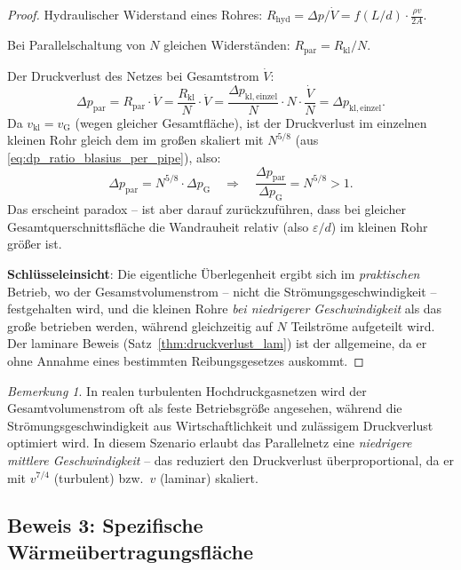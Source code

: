 ﻿\documentclass[12pt,a4paper,twoside]{article}
\theoremstyle{plain}
\theoremstyle{definition}
\theoremstyle{remark}
\newtheorem{remark}[theorem]{Bemerkung}
\begin{document}
\begin{proof}
\noindent
Hydraulischer Widerstand eines Rohres:
$R_{\mathrm{hyd}} = \Delta p / \dot{V} = f(L/d) \cdot \frac{\rho v}{2 A}$.

\noindent
Bei Parallelschaltung von $N$ gleichen Widerständen:
$R_{\mathrm{par}} = R_{\mathrm{kl}} / N$.

\noindent
Der Druckverlust des Netzes bei Gesamtstrom $\dot{V}$:
\begin{equation}
  \Delta p_{\mathrm{par}} = R_{\mathrm{par}} \cdot \dot{V}
    = \frac{R_{\mathrm{kl}}}{N} \cdot \dot{V}
    = \frac{\Delta p_{\mathrm{kl, einzel}}}{N} \cdot N \cdot \frac{\dot{V}}{N}
    = \Delta p_{\mathrm{kl,einzel}}.
  \label{eq:parallel_dp}
\end{equation}
Da $v_{\mathrm{kl}} = v_{\mathrm{G}}$ (wegen gleicher Gesamtfläche),
ist der Druckverlust im einzelnen kleinen Rohr gleich dem im großen
skaliert mit $N^{5/8}$ (aus \cref{eq:dp_ratio_blasius_per_pipe}), also:
\begin{equation}
  \Delta p_{\mathrm{par}} = N^{5/8} \cdot \Delta p_{\mathrm{G}}
  \quad \Longrightarrow \quad
  \frac{\Delta p_{\mathrm{par}}}{\Delta p_{\mathrm{G}}} = N^{5/8} > 1.
\end{equation}
Das erscheint paradox -- ist aber darauf zurückzuführen, dass bei gleicher
Gesamtquerschnittsfläche die Wandrauheit relativ (also $\varepsilon/d$) im
kleinen Rohr größer ist.

\textbf{Schlüsseleinsicht}: Die eigentliche Überlegenheit ergibt sich im
\emph{praktischen} Betrieb, wo der Gesamstvolumenstrom -- nicht die
Strömungsgeschwindigkeit -- festgehalten wird, und die kleinen Rohre
\emph{bei niedrigerer Geschwindigkeit} als das große betrieben werden,
während gleichzeitig auf $N$ Teilströme aufgeteilt wird.
Der laminare Beweis (Satz~\ref{thm:druckverlust_lam}) ist der allgemeine,
da er ohne Annahme eines bestimmten Reibungsgesetzes auskommt.
\end{proof}

\begin{remark}
In realen turbulenten Hochdruckgasnetzen wird der Gesamtvolumenstrom oft als
feste Betriebsgröße angesehen, während die Strömungsgeschwindigkeit aus
Wirtschaftlichkeit und zulässigem Druckverlust optimiert wird.
In diesem Szenario erlaubt das Parallelnetz eine \emph{niedrigere mittlere
Geschwindigkeit} -- das reduziert den Druckverlust überproportional, da er
mit $v^{7/4}$ (turbulent) bzw.\ $v$ (laminar) skaliert.
\end{remark}

\subsection{Beweis 3: Spezifische Wärmeübertragungsfläche}
\label{ssec:beweis_waerme}
\end{document}
